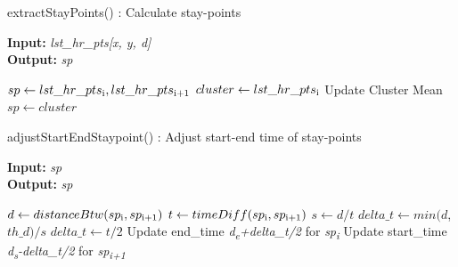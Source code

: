 \documentclass{article}
\begin{document}
\begin{algorithm}
\caption{extractStayPoints() : Calculate stay-points}
\label{pseudoPSO}
\hspace*{\algorithmicindent} \textbf{Input:}  \textit{lst\_hr\_pts[x, y, d]} \\
\hspace*{\algorithmicindent} \textbf{Output:}  \textit{sp} 
\begin{algorithmic}[1]

	\State$ sp \gets lst\_hr\_pts\textsubscript{i},  lst\_hr\_pts\textsubscript{i+1}$
	\State $cluster \gets lst\_hr\_pts\textsubscript{i}$ 
	\State Update Cluster Mean
    \State $sp \gets cluster$
\EndIf

\EndFor
\end{algorithmic}
\end{algorithm}

\begin{algorithm}
\caption{adjustStartEndStaypoint() : Adjust start-end time of stay-points}
\label{pseudoPSO}
\hspace*{\algorithmicindent} \textbf{Input:}  \textit{sp} \\
\hspace*{\algorithmicindent} \textbf{Output:}  \textit{sp}
\begin{algorithmic}[1]
	\State $d \gets distanceBtw(sp\textsubscript{i}, sp\textsubscript{i+1})$
	\State $t \gets timeDiff(sp\textsubscript{i}, sp\textsubscript{i+1})$
	\State $s \gets d/t$
		\State $delta\_t \gets min(d$, $th\_d)/s$
	\Else
		\State $delta\_t \gets t/2$
	\EndIf
	\State Update end\_time \textit{d\textsubscript{e}+delta\_t/2}  for \textit{sp\textsubscript{i}}
	\State Update start\_time \textit{d\textsubscript{s}-delta\_t/2} for \textit{sp\textsubscript{i+1}}
\EndFor
\end{algorithmic}
\end{algorithm}
\end{document}
